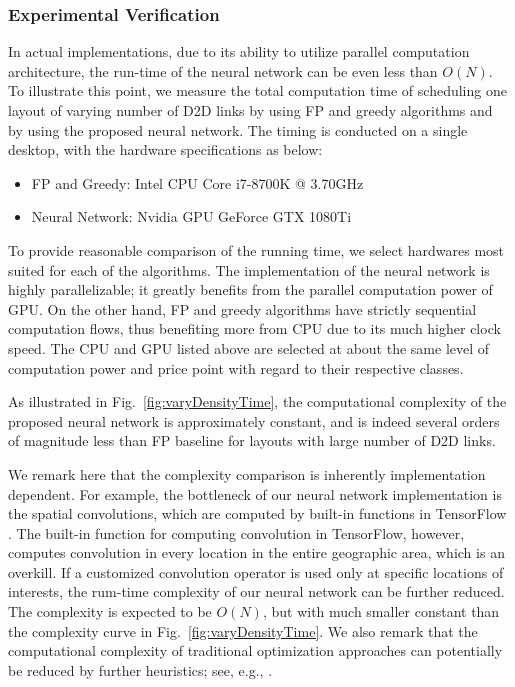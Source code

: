 \documentclass[journal,12pt,onecolumn,draftclsnofoot,]{IEEEtran}
\begin{document}
\subsubsection{Experimental Verification}
In actual implementations, due to its ability to utilize parallel computation
architecture, the run-time of the neural network can be even less than $O(N)$. 
To illustrate this point, we measure the total computation time of scheduling one layout of varying number of D2D
links by using FP and greedy algorithms and by using the proposed neural
network.  The timing is conducted on a single desktop, with the hardware
specifications as below:
\begin{itemize}
    \item FP and Greedy: Intel CPU Core i7-8700K @ 3.70GHz
    \item Neural Network: Nvidia GPU GeForce GTX 1080Ti
\end{itemize}
To provide reasonable comparison of the running time, we select hardwares most
suited for each of the algorithms. The implementation of the neural network is
highly parallelizable; it greatly benefits from the parallel computation power
of GPU. On the other hand, FP and greedy algorithms have strictly sequential
computation flows, thus benefiting more from CPU due to its much higher clock
speed. The CPU and GPU listed above are selected at about the same level of
computation power and price point with regard to their respective classes.

As illustrated in Fig.~\ref{fig:varyDensityTime}, the computational complexity
of the proposed neural network is approximately constant, and is indeed several
orders of magnitude less than FP baseline for layouts with large number of D2D
links.  

We remark here that the complexity comparison is inherently implementation
dependent. For example, the bottleneck of our neural network implementation is
the spatial convolutions, which are computed by built-in functions in TensorFlow
\cite{tensorflow}. The built-in function for computing 
convolution in TensorFlow, however, computes convolution in every location in
the entire geographic area, which is an overkill. If a customized convolution
operator is used only at specific locations of interests, the rum-time complexity
of our neural network can be further reduced. The complexity is expected to be
$O(N)$, but with much smaller constant than the complexity curve in
Fig.~\ref{fig:varyDensityTime}. We also remark that the computational
complexity of traditional optimization approaches can potentially be reduced by
further heuristics; see, e.g., \cite{Guo_1000}.
\end{document}
